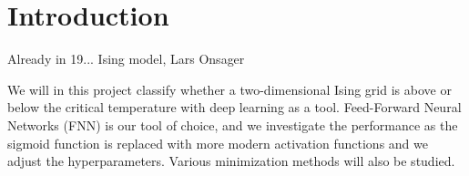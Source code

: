 \section{Introduction} \label{sec:introduction}
Already in 19... Ising model, Lars Onsager

We will in this project classify whether a two-dimensional Ising grid is above or below the critical temperature with deep learning as a tool. Feed-Forward Neural Networks (FNN) is our tool of choice, and we investigate the performance as the sigmoid function is replaced with more modern activation functions and we adjust the hyperparameters. Various minimization methods will also be studied. 


